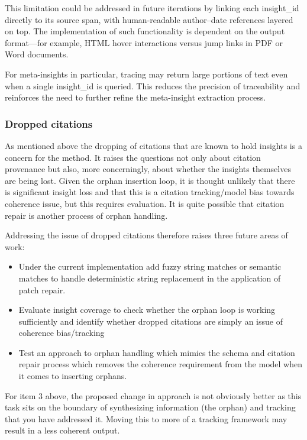 \documentclass[
  11pt,
]{article}
\begin{document}
This limitation could be addressed in future iterations by linking each
insight\_id directly to its source span, with human-readable
author--date references layered on top. The implementation of such
functionality is dependent on the output format---for example, HTML
hover interactions versus jump links in PDF or Word documents.

For meta-insights in particular, tracing may return large portions of
text even when a single insight\_id is queried. This reduces the
precision of traceability and reinforces the need to further refine the
meta-insight extraction process.

\subsubsection{Dropped citations}\label{dropped-citations}

As mentioned above the dropping of citations that are known to 
hold insights is a concern for the method. It raises the questions not 
only about citation provenance but also, more concerningly, about whether 
the insights themselves are being lost. Given the orphan insertion loop, 
it is thought unlikely that there is significant insight loss and that this 
is a citation tracking/model bias towards coherence issue, but this requires 
evaluation. It is quite possible that citation repair is another process of 
orphan handling. 

Addressing the issue of dropped citations therefore raises three future areas of work:
\begin{itemize}
  \item Under the current implementation add fuzzy string matches or semantic matches to handle 
deterministic string replacement in the application of patch repair.
  \item Evaluate insight coverage to check whether the orphan loop is working sufficiently 
and identify whether dropped citations are simply an issue of coherence bias/tracking
  \item Test an approach to orphan handling which mimics the schema and citation repair 
process which removes the coherence requirement from the model when it comes to inserting 
orphans.
\end{itemize}

For item 3 above, the proposed change in approach is not obviously better as this task sits 
on the boundary of synthesizing information (the orphan) and tracking that you have addressed 
it. Moving this to more of a tracking framework may result in a less coherent output. 
\end{document}
